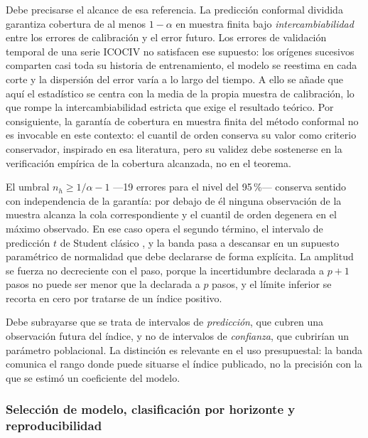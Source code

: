 \documentclass[12pt,letterpaper]{article}
\providecommand{\parencite}{\citep}
\newcommand{\ICOCIV}{ICOCIV}
\begin{document}
Debe precisarse el alcance de esa referencia. La predicción conformal dividida garantiza cobertura de al menos $1-\alpha$ en muestra finita bajo \emph{intercambiabilidad} entre los errores de calibración y el error futuro. Los errores de validación temporal de una serie \ICOCIV{} no satisfacen ese supuesto: los orígenes sucesivos comparten casi toda su historia de entrenamiento, el modelo se reestima en cada corte y la dispersión del error varía a lo largo del tiempo. A ello se añade que aquí el estadístico se centra con la media de la propia muestra de calibración, lo que rompe la intercambiabilidad estricta que exige el resultado teórico. Por consiguiente, la garantía de cobertura en muestra finita del método conformal no es invocable en este contexto: el cuantil de orden conserva su valor como criterio conservador, inspirado en esa literatura, pero su validez debe sostenerse en la verificación empírica de la cobertura alcanzada, no en el teorema.

El umbral $n_h\ge 1/\alpha-1$ ---19 errores para el nivel del 95\,\%--- conserva sentido con independencia de la garantía: por debajo de él ninguna observación de la muestra alcanza la cola correspondiente y el cuantil de orden degenera en el máximo observado. En ese caso opera el segundo término, el intervalo de predicción $t$ de Student clásico \parencite{hyndman2021fpp3}, y la banda pasa a descansar en un supuesto paramétrico de normalidad que debe declararse de forma explícita. La amplitud se fuerza no decreciente con el paso, porque la incertidumbre declarada a $p+1$ pasos no puede ser menor que la declarada a $p$ pasos, y el límite inferior se recorta en cero por tratarse de un índice positivo.

Debe subrayarse que se trata de intervalos de \emph{predicción}, que cubren una observación futura del índice, y no de intervalos de \emph{confianza}, que cubrirían un parámetro poblacional. La distinción es relevante en el uso presupuestal: la banda comunica el rango donde puede situarse el índice publicado, no la precisión con la que se estimó un coeficiente del modelo.

\subsubsection{Selección de modelo, clasificación por horizonte y reproducibilidad}
\end{document}
